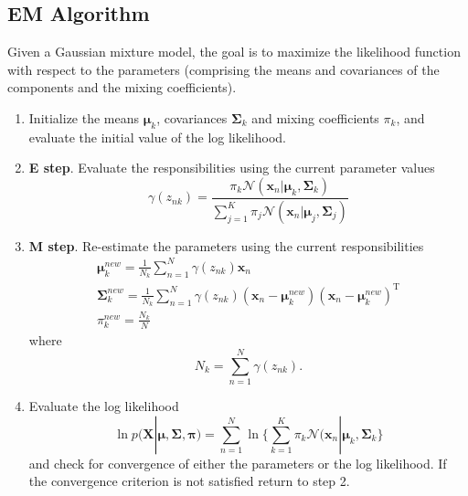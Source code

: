 \documentclass[a4paper, 11pt]{article}
\numberwithin{equation}{subsection}
\begin{document}
\subsection{EM Algorithm}
Given a Gaussian mixture model, the goal is to maximize the likelihood function with respect to the parameters (comprising the means and covariances of the components and the mixing coefficients).
\begin{enumerate}
	\item Initialize the means $\boldsymbol\mu_k$, covariances $\boldsymbol\Sigma_k$ and mixing coefficients $\pi_k$, and evaluate the initial value of the log likelihood.
	\item \textbf{E step}. Evaluate the responsibilities using the current parameter values
	\begin{equation}
	\gamma(z_{nk})=\frac{\pi_k\mathcal N(\mathbf x_n|\boldsymbol\mu_k,\boldsymbol\Sigma_k)}{\sum_{j=1}^K\pi_j\mathcal N(\mathbf x_n|\boldsymbol\mu_j,\boldsymbol\Sigma_j)}
	\end{equation}
	\item \textbf{M step}. Re-estimate the parameters using the current responsibilities
	\begin{gather}
	\boldsymbol\mu_k^{new}=\frac{1}{N_k}\sum_{n=1}^N\gamma(z_{nk})\mathbf x_n\\
	\boldsymbol\Sigma_k^{new}=\frac{1}{N_k}\sum_{n=1}^N\gamma(z_{nk})(\mathbf x_n-\boldsymbol\mu_k^{new})(\mathbf x_n-\boldsymbol\mu_k^{new})^{\mathrm T}\\
	\pi_k^{new}=\frac{N_k}{N}
	\end{gather}
	where 
	\begin{equation}
	N_k=\sum_{n=1}^N\gamma(z_{nk}).
	\end{equation}
	\item Evaluate the log likelihood
	\begin{equation}
	\ln p(\mathbf X|\boldsymbol\mu,\boldsymbol\Sigma,\boldsymbol\pi)=\sum_{n=1}^N\ln \{\sum_{k=1}^K\pi_k\mathcal N(\mathbf x_n|\boldsymbol\mu_k,\boldsymbol\Sigma_k\}
	\end{equation}
	and check for convergence of either the parameters or the log likelihood. If the convergence criterion is not satisfied return to step 2.
	
\end{enumerate}
\end{document}

